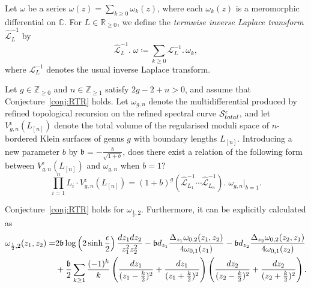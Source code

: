\documentclass[10pt,a4paper]{amsart}
\begin{document}
\begin{definition}\label{def:termwise}
    Let $\omega$ be a series $\omega(z)=\sum_{k\geq0} \omega_{k}(z)$, where each $\omega_{k}(z)$ is a meromorphic differential on $\mathbb{C}$. For $L\in\mathbb{R}_{\geq0}$, we define the \emph{termwise inverse Laplace transform} $\hat{\mathcal{L}}^{-1}_L$ by
    \begin{equation*}
    \hat{\mathcal{L}}^{-1}_L.\;\omega\coloneqq\sum_{k\geq0} \mathcal{L}^{-1}_L.\,\omega_{k},
\end{equation*}
where $\mathcal{L}^{-1}_L$ denotes the usual inverse Laplace transform.
\end{definition}

\begin{question}\label{conj:main}
   Let $g\in\mathbb{Z}_{\geq0}$ and $n\in\mathbb{Z}_{\geq1}$ satisfy $2g-2+n>0$, and assume that Conjecture~\ref{conj:RTR} holds. Let $\omega_{g,n}$ denote the multidifferential produced by refined topological recursion on the refined spectral curve $\mathcal{S}^{\epsilon}_{\textup{total}}$, and let $V_{g,n}^\epsilon(L_{[n]})$ denote the total volume of the regularised moduli space of $n$-bordered Klein surfaces of genus $g$ with boundary lengths $L_{[n]}$.
 Introducing a new parameter $b$ by $\mathfrak{b} = -\frac{b}{\sqrt{1+b}}$, does there exist a relation of the following form between $V_{g,n}^\epsilon(L_{[n]})$ and $\omega_{g,n}$ when $b=1$?
    \begin{equation}
     \prod_{i=1}^nL_i\cdot V_{g,n}^\epsilon(L_{[n]})= (1+b)^{g}(\hat{\mathcal{L}}_{L_1}^{-1}\cdots \hat{\mathcal{L}}_{L_n}^{-1}).\;\omega_{g,n}\Big|_{b=1}.\label{V and omega relation}
    \end{equation}
\end{question}

\begin{proposition}\label{prop:1/2,2}
Conjecture~\ref{conj:RTR} holds for $\omega_{\frac12,2}$. Furthermore, it can be explicitly calculated as
\begin{align}
\omega_{\frac12,2}(z_1,z_2)=&2\mathfrak{b}\log\left(2\sinh\frac{\epsilon}{2}\right)\frac{dz_1dz_2}{z_1^2z_2^2}-\mathfrak{b}d_{z_1}\frac{\Delta_{z_1}\omega_{0,2}(z_1,z_2)}{4\omega_{0,1}(z_1)}-\mathfrak{b}d_{z_2}\frac{\Delta_{z_2}\omega_{0,2}(z_2,z_1)}{4\omega_{0,1}(z_2)}\nonumber\\
&+\frac{\mathfrak{b}}{2}\sum_{k\geq1}\frac{(-1)^k}{k}\left(\frac{dz_1}{(z_1-\frac{k}{2})^2}+\frac{dz_1}{(z_1+\frac{k}{2})^2}\right)\left(\frac{dz_2}{(z_2-\frac{k}{2})^2}+\frac{dz_2}{(z_2+\frac{k}{2})^2}\right)\label{explicit w_{1/2,2}}.
\end{align}
\end{proposition}
\end{document}
